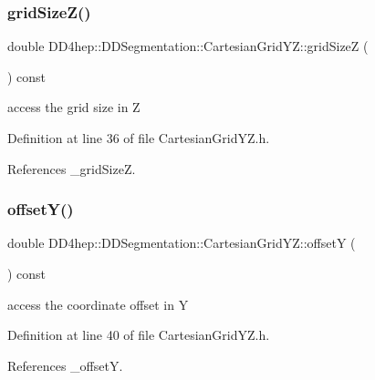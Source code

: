 \subsubsection{\texorpdfstring{grid\+Size\+Z()}{gridSizeZ()}}
{\footnotesize\ttfamily double D\+D4hep\+::\+D\+D\+Segmentation\+::\+Cartesian\+Grid\+Y\+Z\+::grid\+SizeZ (\begin{DoxyParamCaption}{ }\end{DoxyParamCaption}) const\hspace{0.3cm}{\ttfamily [inline]}}



access the grid size in Z 



Definition at line 36 of file Cartesian\+Grid\+Y\+Z.\+h.



References \+\_\+grid\+SizeZ.

\hypertarget{class_d_d4hep_1_1_d_d_segmentation_1_1_cartesian_grid_y_z_a45697372b91d1c13ff49549108dadb1d}{}\label{class_d_d4hep_1_1_d_d_segmentation_1_1_cartesian_grid_y_z_a45697372b91d1c13ff49549108dadb1d} 
\subsubsection{\texorpdfstring{offset\+Y()}{offsetY()}}
{\footnotesize\ttfamily double D\+D4hep\+::\+D\+D\+Segmentation\+::\+Cartesian\+Grid\+Y\+Z\+::offsetY (\begin{DoxyParamCaption}{ }\end{DoxyParamCaption}) const\hspace{0.3cm}{\ttfamily [inline]}}



access the coordinate offset in Y 



Definition at line 40 of file Cartesian\+Grid\+Y\+Z.\+h.



References \+\_\+offsetY.

\hypertarget{class_d_d4hep_1_1_d_d_segmentation_1_1_cartesian_grid_y_z_afa4c64608337fc2facae22ece1cdba43}{}\label{class_d_d4hep_1_1_d_d_segmentation_1_1_cartesian_grid_y_z_afa4c64608337fc2facae22ece1cdba43} 
